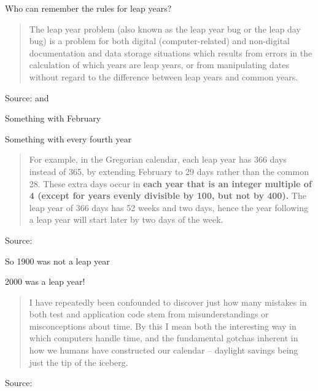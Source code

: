 \documentclass[Screen16to9,17pt]{foils}
\begin{document}


Who can remember the rules for leap years?

\begin{quote}
The leap year problem (also known as the leap year bug or the leap day bug) is a problem for both digital (computer-related) and non-digital documentation and data storage situations which results from errors in the calculation of which years are leap years, or from manipulating dates without regard to the difference between leap years and common years.
\end{quote}
Source:  and

\begin{list2}
\item Something with February
\item Something with every fourth year
\end{list2}



\begin{quote}
For example, in the Gregorian calendar, each leap year has 366 days instead of 365, by extending February to 29 days rather than the common 28. These extra days occur in {\bf each year that is an integer multiple of 4 (except for years evenly divisible by 100, but not by 400).} The leap year of 366 days has 52 weeks and two days, hence the year following a leap year will start later by two days of the week.
\end{quote}
Source: 

\begin{list2}
\item So 1900 was not a leap year
\item 2000 was a leap year!
\end{list2}




\begin{quote}
I have repeatedly been confounded to discover just how many mistakes in both test and application code stem from misunderstandings or misconceptions about time. By this I mean both the interesting way in which computers handle time, and the fundamental gotchas inherent in how we humans have constructed our calendar – daylight savings being just the tip of the iceberg.
\end{quote}
Source: 
\end{document}
